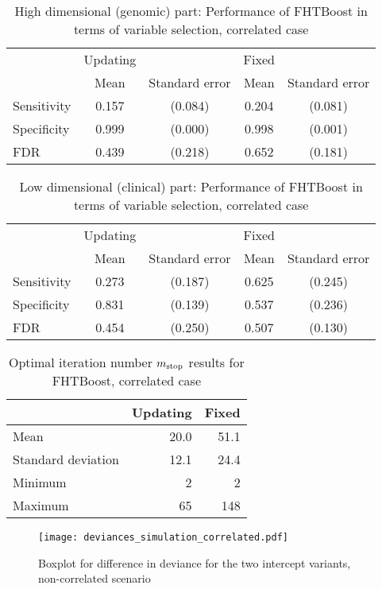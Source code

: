 \begin{table}
\caption{High dimensional (genomic) part: Performance of FHTBoost in terms of variable selection, correlated case}
\label{table:correlated-y0}
\centering
\begin{tabular}{l|cc|cc}
\toprule
& Updating & & Fixed & \\
& Mean & Standard error & Mean & Standard error \\
\hline
Sensitivity & 0.157 & (0.084) & 0.204 & (0.081) \\
Specificity & 0.999 & (0.000) & 0.998 & (0.001) \\
FDR         & 0.439 & (0.218) & 0.652 & (0.181) \\
\bottomrule
\end{tabular}
\end{table}

\begin{table}
\caption{Low dimensional (clinical) part: Performance of FHTBoost in terms of variable selection, correlated case}
\label{table:correlated-mu}
\centering
\begin{tabular}{l|cc|cc}
\toprule
& Updating & & Fixed & \\
& Mean & Standard error & Mean & Standard error \\
\hline
Sensitivity & 0.273 & (0.187) & 0.625 & (0.245) \\
Specificity & 0.831 & (0.139) & 0.537 & (0.236) \\
FDR         & 0.454 & (0.250) & 0.507 & (0.130) \\
\bottomrule
\end{tabular}
\end{table}

\begin{table}
\caption{Optimal iteration number $m_{\text{stop}}$ results for FHTBoost, correlated case}
\label{table:correlated-mstop}
\centering
\begin{tabular}{l|rr}
\toprule
& Updating & Fixed \\
\hline
Mean               &  20.0  &  51.1  \\
Standard deviation &  12.1  &  24.4  \\
Minimum            &     2  &     2  \\
Maximum            &    65  &   148  \\
\bottomrule
\end{tabular}
\end{table}

\begin{figure}
\caption{Boxplot for difference in deviance for the two intercept variants, non-correlated scenario}
\label{fig:simulation-correlated-deviances-boxplot}
\centering\texttt{[image: deviances\_simulation\_correlated.pdf]}
\end{figure}

